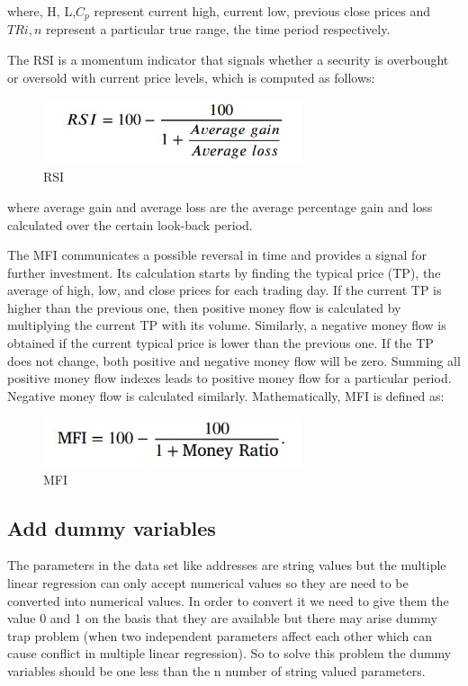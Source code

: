 where, H, L,$ C_p$ represent current high, current low, previous close prices and $T Ri, n$ represent a particular true range, the time period respectively.
\par 
The RSI is a momentum indicator that signals whether a security is overbought or oversold with current price levels, which is computed as follows:\par 
\begin{figure}[tbh] %
\begin{center}
	\includegraphics[width=3in]{images/fmla2.jpg} 
	\caption{RSI} %
	\label{RSI} %
\end{center}
\end{figure}
where average gain and average loss are the average percentage gain and loss calculated over the certain look-back period.
\par 
The MFI communicates a possible reversal in time and provides a signal for further investment. Its calculation starts by finding the typical price (TP), the average of high, low, and close prices for each trading day. If the current TP is higher than the previous one, then positive money flow is calculated by multiplying the current TP with its volume. Similarly, a negative money flow is obtained if the current typical price is lower than the previous one. If the TP does not change, both positive and negative money flow will be zero. Summing all positive money flow indexes leads to positive money flow for a particular period. Negative money flow is calculated similarly. Mathematically, MFI is defined as:
\begin{figure}[tbh] %
\begin{center}
	\includegraphics[width=3in]{images/fmla3.jpg} 
	\caption{MFI} %
	\label{MFI} %
\end{center}
\end{figure}
\subsection{Add dummy variables}
\vspace{-18pt}
The parameters in the data set like addresses are string values but the multiple linear regression can only accept numerical values so they are need to be converted into numerical values. In order to convert it we need to give them the value 0 and 1 on the basis that they are available but there may arise dummy trap problem (when two independent parameters affect each other which can cause conflict in multiple linear regression). So to solve this problem the dummy variables should be one less than the n number of string valued parameters.
